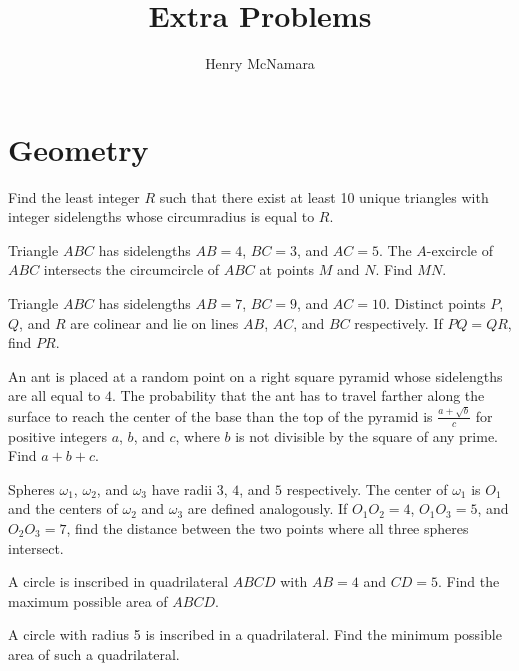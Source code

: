 \documentclass[11pt]{scrartcl}
\title{Extra Problems}
\author{Henry McNamara}
\begin{document}
\section{Geometry}

\begin{problem}[14-15]
    Find the least integer $R$ such that there exist at least 10 unique triangles with integer sidelengths whose circumradius is equal to $R$.
\end{problem}

\begin{problem}
    Triangle $ABC$ has sidelengths $AB = 4$, $BC = 3$, and $AC = 5$. The $A$-excircle of $ABC$ intersects the circumcircle of $ABC$ at points $M$ and $N$. Find $MN$.
\end{problem}

\begin{problem}[11-15]
    Triangle $ABC$ has sidelengths $AB = 7$, $BC = 9$, and $AC = 10$. Distinct points $P$, $Q$, and $R$ are colinear and lie on lines $AB$, $AC$, and $BC$ respectively. If $PQ = QR$, find $PR$.
\end{problem}

\begin{problem}[5]
    An ant is placed at a random point on a right square pyramid whose sidelengths are all equal to $4$. The probability that the ant has to travel farther along the surface to reach the center of the base than the top of the pyramid is $\frac{a + \sqrt{b}}{c}$ for positive integers $a$, $b$, and $c$, where $b$ is not divisible by the square of any prime. Find $a + b + c$.
\end{problem}

\begin{problem}
    Spheres $\omega_{1}$, $\omega_{2}$, and $\omega_{3}$ have radii $3$, $4$, and $5$ respectively. The center of $\omega_{1}$ is $O_{1}$ and the centers of $\omega_{2}$ and $\omega_{3}$ are defined analogously. If $O_{1}O_{2} = 4$, $O_{1}O_{3} = 5$, and $O_{2}O_{3} = 7$, find the distance between the two points where all three spheres intersect.
\end{problem}

\begin{problem}
    A circle is inscribed in quadrilateral $ABCD$ with $AB = 4$ and $CD = 5$. Find the maximum possible area of $ABCD$.
\end{problem}

\begin{problem}
    A circle with radius 5 is inscribed in a quadrilateral. Find the minimum possible area of such a quadrilateral.
\end{problem}
\end{document}

